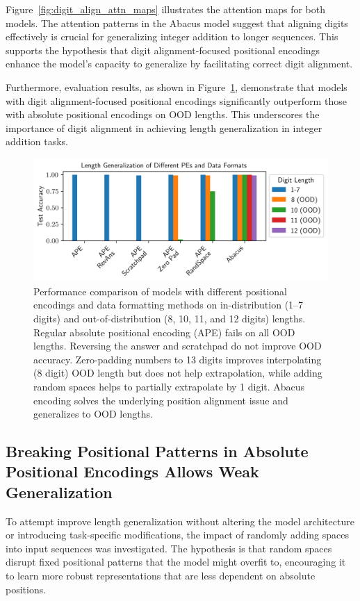 Figure~\ref{fig:digit_align_attn_maps} illustrates the attention maps for both models. The attention patterns in the Abacus model suggest that aligning digits effectively is crucial for generalizing integer addition to longer sequences. This supports the hypothesis that digit alignment-focused positional encodings enhance the model's capacity to generalize by facilitating correct digit alignment.


Furthermore, evaluation results, as shown in Figure~\ref{fig:pe_results}, demonstrate that models with digit alignment-focused positional encodings significantly outperform those with absolute positional encodings on OOD lengths. This underscores the importance of digit alignment in achieving length generalization in integer addition tasks.

\begin{figure}[h!]
    \centering
    \includegraphics[width=\textwidth]{fig/pe_results.png}
    \caption{Performance comparison of models with different positional encodings and data formatting methods on in-distribution (1--7 digits) and out-of-distribution (8, 10, 11, and 12 digits) lengths. Regular absolute positional encoding (APE) fails on all OOD lengths. Reversing the answer and scratchpad do not improve OOD accuracy. Zero-padding numbers to 13 digits improves interpolating (8 digit) OOD length but does not help extrapolation, while adding random spaces helps to partially extrapolate by 1 digit. Abacus encoding solves the underlying position alignment issue and generalizes to OOD lengths.}
    \label{fig:pe_results}
\end{figure}

\subsection{Breaking Positional Patterns in Absolute Positional Encodings Allows Weak Generalization}

To attempt improve length generalization without altering the model architecture or introducing task-specific modifications, the impact of randomly adding spaces into input sequences was investigated. The hypothesis is that random spaces disrupt fixed positional patterns that the model might overfit to, encouraging it to learn more robust representations that are less dependent on absolute positions.

